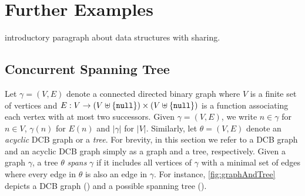 \section{Further Examples}\label{sec:examples}
\todo introductory paragraph about data structures with sharing.\\
\subsection{Concurrent Spanning Tree}
Let $\gamma = (V, E)$ denote a connected directed binary graph where $V$ is a finite set of vertices and $E: V \rightarrow (V \uplus \{\texttt{null}\}) \times (V \uplus \{\texttt{null}\})$ is a function associating each vertex with at most two successors. Given $\gamma = (V, E)$, we write $n \in \gamma$ for $n \in V$, $\gamma(n)$ for $E(n)$ and $|\gamma|$ for $|V|$. Similarly, let $\theta = (V, E)$ denote an \emph{acyclic} DCB graph or a \emph{tree}. For brevity, in this section we refer to a DCB graph and an acyclic DCB graph simply as a graph and a tree, respectively. Given a graph $\gamma$, a tree $\theta$ \emph{spans} $\gamma$ if it includes all vertices of $\gamma$ with a minimal set of edges where every edge in $\theta$ is also an edge in $\gamma$. 
For instance, \fig\ref{fig:graphAndTree} depicts a DCB graph () and a possible spanning tree ().

